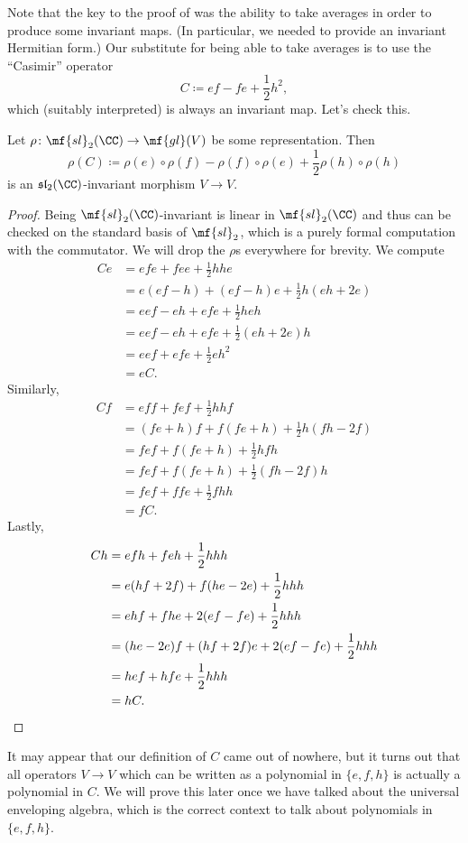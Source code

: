 \documentclass[../notes.tex]{subfiles}
\begin{document}
Note that the key to the proof of  was the ability to take averages in order to produce some invariant maps. (In particular, we needed to provide an invariant Hermitian form.) Our substitute for being able to take averages is to use the ``Casimir'' operator
\[C\coloneqq ef-fe+\frac12h^2,\]
which (suitably interpreted) is always an invariant map. Let's check this.
\begin{lemma} \label{lem:sl2-casimir-invariant}
	Let $\rho\colon\mf{sl}_2(\CC)\to\mf{gl}(V)$ be some representation. Then
	\[\rho(C)\coloneqq\rho(e)\circ\rho(f)-\rho(f)\circ\rho(e)+\frac12\rho(h)\circ\rho(h)\]
	is an $\mathfrak{sl}_2(\CC)$-invariant morphism $V\to V$.
\end{lemma}
\begin{proof}
	Being $\mf{sl}_2(\CC)$-invariant is linear in $\mf{sl}_2(\CC)$ and thus can be checked on the standard basis of $\mf{sl}_2$, which is a purely formal computation with the commutator. We will drop the $\rho$s everywhere for brevity. We compute
	\begin{align*}
		Ce &= efe+fee+\frac12hhe \\
		&= e(ef-h)+(ef-h)e+\frac12h(eh+2e) \\
		&= eef-eh+efe+\frac12heh \\
		&= eef-eh+efe+\frac12(eh+2e)h \\
		&= eef+efe+\frac12eh^2 \\
		&= eC.
	\end{align*}
	Similarly,
	\begin{align*}
		Cf &= eff+fef+\frac12hhf \\
		&= (fe+h)f+f(fe+h)+\frac12h(fh-2f) \\
		&= fef+f(fe+h)+\frac12hfh \\
		&= fef+f(fe+h)+\frac12(fh-2f)h \\
		&= fef+ffe+\frac12fhh \\
		&= fC.
	\end{align*}
	Lastly,
	\begin{align*}
		Ch &= efh+feh+\frac12hhh \\
		&= e(hf+2f)+f(he-2e)+\frac12hhh \\
		&= ehf+fhe+2(ef-fe)+\frac12hhh \\
		&= (he-2e)f+(hf+2f)e+2(ef-fe)+\frac12hhh \\
		&= hef+hfe+\frac12hhh \\
		&= hC.
		\qedhere
	\end{align*}
\end{proof}
\begin{remark}
	It may appear that our definition of $C$ came out of nowhere, but it turns out that all operators $V\to V$ which can be written as a polynomial in $\{e,f,h\}$ is actually a polynomial in $C$. We will prove this later once we have talked about the universal enveloping algebra, which is the correct context to talk about polynomials in $\{e,f,h\}$.
\end{remark}
\end{document}
